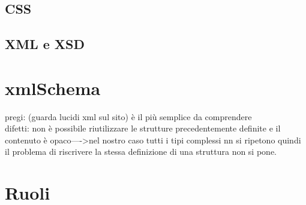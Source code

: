 \documentclass[12pt]{article}
\begin{document}
	\subsection{CSS}
	\subsection{XML e XSD}

\section{xmlSchema}

pregi: (guarda lucidi xml sul sito)
è il più semplice da comprendere\\
difetti: non è possibile riutilizzare le strutture precedentemente definite e il contenuto è opaco---->nel nostro caso tutti i tipi complessi nn si ripetono quindi il problema di riscrivere la stessa definizione di una struttura non si pone.




\section{Ruoli}

	


\newpage
\end{document}
